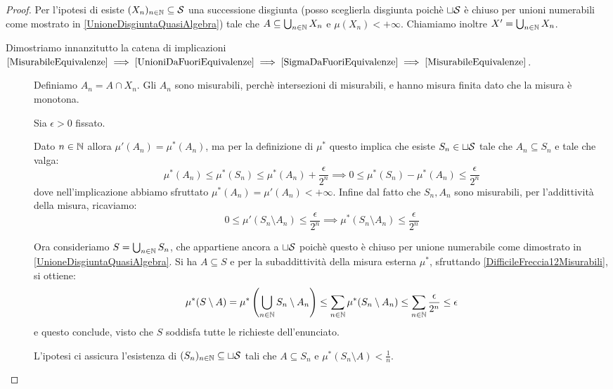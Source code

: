 \begin{proof}
	Per l'ipotesi di \sigfin[ezza] esiste $(X_n)_{n\in\N}\subseteq \S$ una successione disgiunta (posso sceglierla disgiunta poichè $\sqcup\S$ è chiuso per unioni numerabili come mostrato in \cref{UnioneDisgiuntaQuasiAlgebra}) tale che $A\subseteq \bigcup_{n\in\N}X_n$ e $\mu(X_n)<+\infty$. Chiamiamo inoltre $X'=\bigcup_{n\in\N}X_n$.
	
	Dimostriamo innanzitutto la catena di implicazioni
	$\text{\ref{MisurabileEquivalenze}}\implies
	\text{\ref{UnioniDaFuoriEquivalenze}}\implies
	\text{\ref{SigmaDaFuoriEquivalenze}}\implies
	\text{\ref{MisurabileEquivalenze}}$.
	\begin{description}
		\item[] Definiamo $A_n=A\cap X_n$. Gli $A_n$ sono misurabili, perchè intersezioni di misurabili, e hanno misura finita dato che la misura è monotona.
		
		Sia $\epsilon>0$ fissato.
		
		Dato $n\in\N$ allora $\mu'(A_n)=\mu^*(A_n)$, ma per la definizione di $\mu^*$ questo implica che esiste $S_n\in\sqcup \S$ tale che $A_n\subseteq S_n$ e tale che valga:
		\begin{equation*}
			\mu^*(A_n)\le \mu^*(S_n) \le \mu^*(A_n)+\frac\epsilon{2^n}\implies
			0\le \mu^*(S_n)-\mu^*(A_n)\le \frac\epsilon{2^n}
		\end{equation*}
		dove nell'implicazione abbiamo sfruttato $\mu^*(A_n)=\mu'(A_n)<+\infty$.
		Infine dal fatto che $S_n,A_n$ sono misurabili, per l'addittività della misura, ricaviamo:
		\begin{equation}\label{DifficileFreccia12Misurabili}
			0\le \mu'(S_n\setminus A_n) \le \frac\epsilon{2^n} \implies \mu^*(S_n\setminus A_n)\le \frac\epsilon{2^n}
		\end{equation}
		
		Ora consideriamo $S=\bigcup_{n\in\N}S_n$, che appartiene ancora a $\sqcup\S$ poichè questo è chiuso per unione numerabile come dimostrato in \cref{UnioneDisgiuntaQuasiAlgebra}. Si ha $A\subseteq S$ e per la subaddittività della misura esterna  $\mu^*$, sfruttando \cref{DifficileFreccia12Misurabili}, si ottiene:
		\begin{equation*}
			\mu^*(S\setminus A)=\mu^*\left(\bigcup_{n\in\N}S_n\setminus A_n\right)\le
			\sum_{n\in\N}\mu^*(S_n\setminus A_n)\le\sum_{n\in\N}\frac\epsilon{2^n}\le \epsilon
		\end{equation*}
		e questo conclude, visto che $S$ soddisfa tutte le richieste dell'enunciato.
		\item[] L'ipotesi ci assicura l'esistenza di $(S_n)_{n\in\N}\subseteq \sqcup \S$ tali che $A\subseteq S_n$ e $\mu^*(S_n\setminus A)<\frac1n$.
		

\end{description}
\end{proof}

